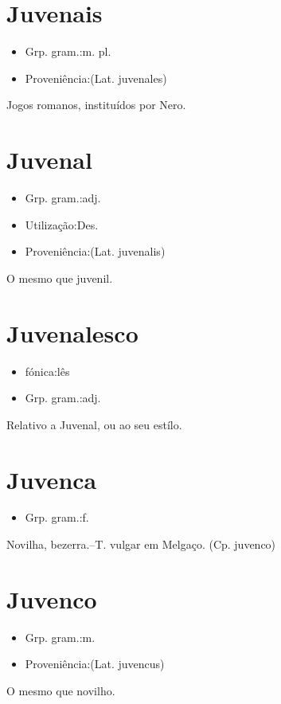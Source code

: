 \documentclass{article}
\begin{document}
\section{Juvenais}
\begin{itemize}
\item {Grp. gram.:m. pl.}
\end{itemize}
\begin{itemize}
\item {Proveniência:(Lat. \textunderscore juvenales\textunderscore )}
\end{itemize}
Jogos romanos, instituídos por Nero.
\section{Juvenal}
\begin{itemize}
\item {Grp. gram.:adj.}
\end{itemize}
\begin{itemize}
\item {Utilização:Des.}
\end{itemize}
\begin{itemize}
\item {Proveniência:(Lat. \textunderscore juvenalis\textunderscore )}
\end{itemize}
O mesmo que \textunderscore juvenil\textunderscore .
\section{Juvenalesco}
\begin{itemize}
\item {fónica:lês}
\end{itemize}
\begin{itemize}
\item {Grp. gram.:adj.}
\end{itemize}
Relativo a Juvenal, ou ao seu estílo.
\section{Juvenca}
\begin{itemize}
\item {Grp. gram.:f.}
\end{itemize}
Novilha, bezerra.--T. vulgar em Melgaço.
(Cp. \textunderscore juvenco\textunderscore )
\section{Juvenco}
\begin{itemize}
\item {Grp. gram.:m.}
\end{itemize}
\begin{itemize}
\item {Proveniência:(Lat. \textunderscore juvencus\textunderscore )}
\end{itemize}
O mesmo que \textunderscore novilho\textunderscore .
\end{document}
